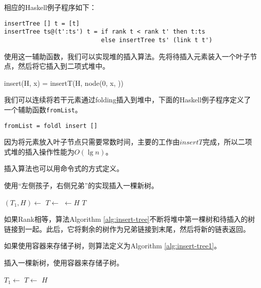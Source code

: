 \documentclass[UTF8]{article}
\begin{document}
相应的Haskell例子程序如下：

\lstset{language=Haskell}
\begin{lstlisting}
insertTree [] t = [t]
insertTree ts@(t':ts') t = if rank t < rank t' then t:ts
                           else insertTree ts' (link t t')
\end{lstlisting}

使用这一辅助函数，我们可以实现堆的插入算法。先将待插入元素装入一个叶子节点，然后将它插入到二项式堆中。

\be
insert(H, x) = insertT(H, node(0, x, \phi))
\ee

我们可以连续将若干元素通过folding插入到堆中，下面的Haskell例子程序定义了一个辅助函数\texttt{fromList}。

\begin{lstlisting}
fromList = foldl insert []
\end{lstlisting}

因为将元素放入叶子节点只需要常数时间，主要的工作由$insertT$完成，所以二项式堆的插入操作性能为$O(\lg n)$。

插入算法也可以用命令式的方式定义。

\begin{algorithm}
\caption{使用“左侧孩子，右侧兄弟”的实现插入一棵新树。}
\label{alg:insert-tree}
\begin{algorithmic}[1]
    \State $(T_1, H) \gets$ 
    \State $T \gets $ 
  \EndWhile
  \State {} $\gets H$
  \State \Return $T$
\EndFunction
\end{algorithmic}
\end{algorithm}

如果Rank相等，算法Algorithm \ref{alg:insert-tree}不断将堆中第一棵树和待插入的树链接到一起。此后，它将剩余的树作为兄弟链接到末尾，然后将新的链表返回。

如果使用容器来存储子树，则算法定义为Algorithm \ref{alg:insert-tree1}。

\begin{algorithm}
\caption{插入一棵新树，使用容器来存储子树。}
\label{alg:insert-tree1}
\begin{algorithmic}[1]
    \State $T_1 \gets$ 
    \State $T \gets $ 
  \EndWhile
  \State {}
  \State \Return $H$
\EndFunction
\end{algorithmic}
\end{algorithm}
\end{document}
